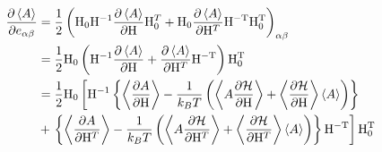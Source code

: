 \documentclass[11pt,a4paper,uplatex]{jsarticle}
\begin{document}
\begin{align}
    \frac{\partial \left<A\right>}{\partial e_{\alpha \beta}} &= \frac{1}{2}\left({\rm H_{0}H^{-1}}\frac{\partial \left<A\right>}{\partial {\rm H}}{\rm H}_{0}^{T} + {\rm H_{0}}\frac{\partial \left<A\right>}{\partial {\rm H}^T}{\rm H^{-T}}{\rm H_{0}^{T}}\right)_{\alpha \beta} \\    
    &= \frac{1}{2}{\rm H_{0}} \left( {\rm H^{-1}}\frac{\partial \left<A\right>}{\partial {\rm H}} 
    + \frac{\partial \left<A\right>}{\partial {\rm H}^T}{\rm H^{-T}}\right) {\rm H_{0}^{T}} \\  
    &= \frac{1}{2}{\rm H_{0}} \left[ {\rm H^{-1}} \left\{ \left< \frac{\partial A}{\partial {\rm H}}  \right> -\frac{1}{k_{B}T} \left(\left< A \frac{\partial {\cal H}}{\partial {\rm H}} \right>  + \left< \frac{\partial {\cal H}}{\partial {\rm H}}\right> \left< A \right> \right) \right \}\right. \\
    &+ \left. \left\{ \left< \frac{\partial A}{\partial {\rm H}^{T}}  \right> -\frac{1}{k_{B}T} \left(\left< A \frac{\partial {\cal H}}{\partial {\rm H}^{T}} \right>  + \left< \frac{\partial {\cal H}}{\partial {\rm H}^{T}}\right> \left< A \right> \right) \right\} {\rm H^{-T}}\right] {\rm H_{0}^{T}} \\ 
\end{align}
\end{document}
